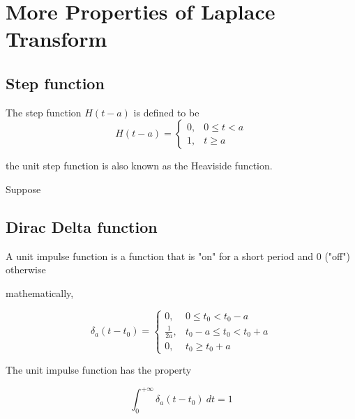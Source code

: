 \section{More Properties of Laplace Transform}

\subsection{Step function}

\begin{definition}
    The step function $H(t - a)$ is defined to be
    \begin{equation}
        H(t - a) = \begin{cases}
            0, & 0 \leq t < a\\
            1, & t \geq a
        \end{cases}
    \end{equation}

    the unit step function is also known as the Heaviside function.
\end{definition}

\begin{theorem}
    Suppose     
\end{theorem}

\subsection{Dirac Delta function}

A unit impulse function is a function that is "on" for a short period and 0 ("off") otherwise



mathematically,

\begin{equation}
    \delta_a(t - t_0) = \begin{cases}
        0, & 0 \leq t_0 < t_0 - a\\
        \frac{1}{2a}, & t_0 - a \leq t_0 < t_0 + a\\
        0, & t_0 \geq t_0 + a
    \end{cases}
\end{equation}

The unit impulse function has the property 

\begin{equation}
    \int_{0}^{+\infty} \delta_a(t - t_0) \> dt = 1
\end{equation}

